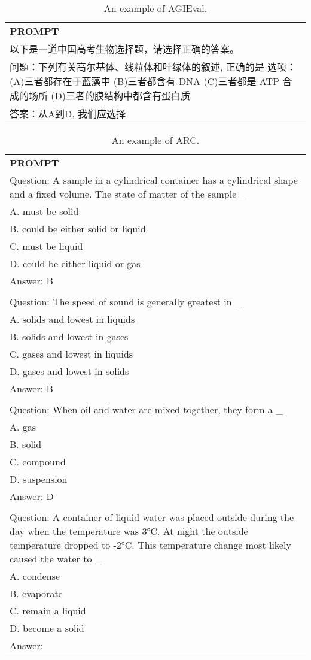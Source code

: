 
\begin{table}[ht]
    \centering \small
\begin{tabular}{p{12cm}}
\toprule
\textbf{PROMPT}\\
以下是一道中国高考生物选择题，请选择正确的答案。\\
问题：下列有关高尔基体、线粒体和叶绿体的叙述, 正确的是 选项：(A)三者都存在于蓝藻中 (B)三者都含有 DNA (C)三者都是 ATP 合成的场所 (D)三者的膜结构中都含有蛋白质\\
答案：从A到D, 我们应选择\\
\bottomrule
\end{tabular}
    \caption{\centering An example of AGIEval.}
    \label{tab:agieval_eval_format_example}
\end{table}

\begin{table}[ht]
    \centering \small
\begin{tabular}{p{12cm}}
\toprule
\textbf{PROMPT}\\
Question: A sample in a cylindrical container has a cylindrical shape and a fixed volume. The state of matter of the sample \_\\
A. must be solid\\
B. could be either solid or liquid\\
C. must be liquid\\
D. could be either liquid or gas\\
Answer: B\\
\\
Question: The speed of sound is generally greatest in \_\\
A. solids and lowest in liquids\\
B. solids and lowest in gases\\
C. gases and lowest in liquids\\
D. gases and lowest in solids\\
Answer: B\\
\\
Question: When oil and water are mixed together, they form a \_\\
A. gas\\
B. solid\\
C. compound\\
D. suspension\\
Answer: D\\
\\
Question: A container of liquid water was placed outside during the day when the temperature was 3°C. At night the outside temperature dropped to -2°C. This temperature change most likely caused the water to \_\\
A. condense\\
B. evaporate\\
C. remain a liquid\\
D. become a solid\\
Answer:\\
\bottomrule
\end{tabular}
    \caption{\centering An example of ARC.}
    \label{tab:arc_eval_format_example}
\end{table}

